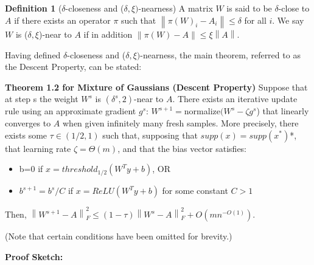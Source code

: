 \textbf{Definition 1} ($\delta$-closeness and ($\delta,
\xi)$-nearness) A matrix $W$ is said to be $\delta$-close to $A$ if
there exists an operator $\pi$ such that $\left \lVert \pi(W)_i - A_i
\right \rVert \leq \delta$ for all $i$. We say $W$ is
($\delta,\xi$)-near to $A$ if in addition $\left \lVert \pi(W)-A
\right \rVert \leq \xi \left \lVert A \right \rVert$.

Having defined $\delta$-closeness and ($\delta, \xi)$-nearness, the
main theorem, referred to as the Descent Property, can be stated:

\textbf{Theorem 1.2 for Mixture of Gaussians (Descent Property)}
Suppose that at step s the weight $W^s$ is $(\delta^s, 2)$-near to
$A$. There exists an iterative update rule using an approximate
gradient $g^s$: $W^{s+1} = $normalize$(W^s - \zeta g^s$) that
linearly converges to $A$ when given infinitely many fresh samples.
More precisely, there exists some $\tau \in (1/2,1)$ such that,
supposing that $supp(x)=supp(x^*)$*, that learning rate
$\zeta=\Theta(m)$, and that the bias vector satisfies:
\begin{itemize}
    \item b=0 if $x = threshold_{1/2} (W^T y +b)$, OR
    \item $b^{s+1} =b^s / C$ if $x = ReLU(W^T y + b)$ for some
    constant $C>1$
\end{itemize}
Then, $\left \lVert W^{s+1}-A \right \rVert_F ^2 \leq (1-\tau) \left
\lVert W^s - A \right \rVert_F ^2 + O(mn^{-O(1)})$.

(Note that certain conditions have been omitted for brevity.)

\textbf{Proof Sketch:}

